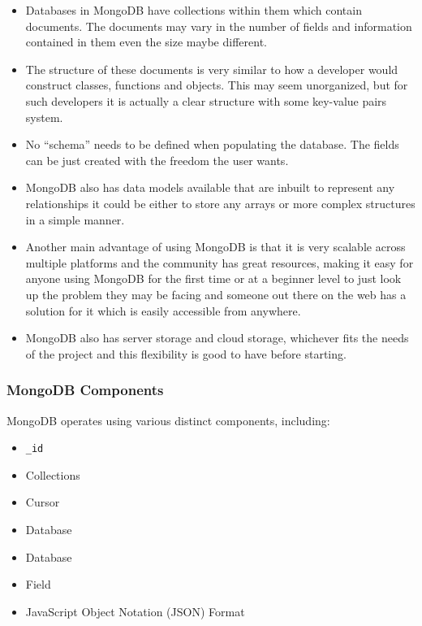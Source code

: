\documentclass[titlepage, 12pt]{article}
\begin{document}
\begin{itemize}
    \item Databases in MongoDB have collections within them which contain documents. The documents may vary in the number of fields and information contained in them even the size maybe different.
    \item The structure of these documents is very similar to how a developer would construct classes, functions and objects. This may seem unorganized, but for such developers it is actually a clear structure with some key-value pairs system.
    \item No “schema” needs to be defined when populating the database. The fields can be just created with the freedom the user wants.
    \item MongoDB also has data models available that are inbuilt to represent any relationships it could be either to store any arrays or more complex structures in a simple manner.
    \item Another main advantage of using MongoDB is that it is very scalable across multiple platforms and the community has great resources, making it easy for anyone using MongoDB for the first time or at a beginner level to just look up the problem they may be facing and someone out there on the web has a solution for it which is easily accessible from anywhere.
    \item MongoDB also has server storage and cloud storage, whichever fits the needs of the project and this flexibility is good to have before starting.
\end{itemize}

\subsubsection{MongoDB Components}

MongoDB operates using various distinct components, including:

\begin{itemize}
    \item \texttt{\_id}
    \item Collections
    \item Cursor
    \item Database
    \item Database
    \item Field
    \item JavaScript Object Notation (JSON) Format
\end{itemize}
\end{document}
